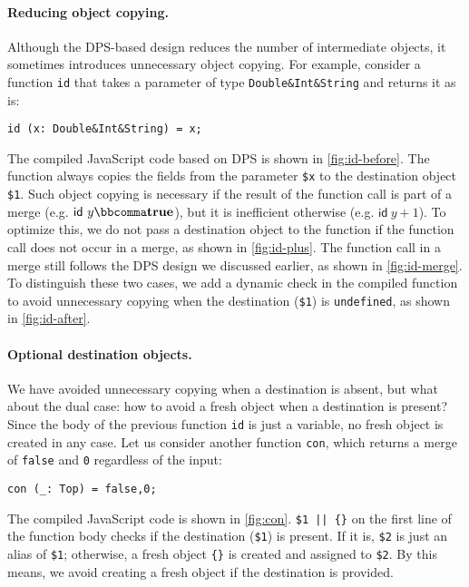 \paragraph{Reducing object copying.} \label{sec:copy}
Although the DPS-based design reduces the number of intermediate objects, it
sometimes introduces unnecessary object copying. For example, consider a
function \lstinline{id} that takes a parameter of type
\lstinline{Double&Int&String} and returns it as is:
\begin{lstlisting}
id (x: Double&Int&String) = x;
\end{lstlisting}
The compiled JavaScript code based on DPS is shown in \autoref{fig:id-before}.
The function always copies the fields from the parameter \lstinline{$x} to the
destination object \lstinline{$1}. Such object copying is necessary if the
result of the function call is part of a merge (e.g. $\textsf{id}\ y \bbcomma  \mathbf{true} $),
but it is inefficient otherwise (e.g. $\textsf{id}\ y + 1$). To optimize this,
we do not pass a destination object to the function if the function call does
not occur in a merge, as shown in \autoref{fig:id-plus}. The function call in a
merge still follows the DPS design we discussed earlier, as shown in
\autoref{fig:id-merge}. To distinguish these two cases, we add a dynamic check
in the compiled function to avoid unnecessary copying when the destination
(\lstinline{$1}) is \lstinline{undefined}, as shown in \autoref{fig:id-after}.

\paragraph{Optional destination objects.}
We have avoided unnecessary copying when a destination is absent, but what about
the dual case: how to avoid a fresh object when a destination is present? Since
the body of the previous function \lstinline{id} is just a variable, no fresh
object is created in any case. Let us consider another function \lstinline{con},
which returns a merge of \lstinline{false} and \lstinline{0} regardless of the
input:
\begin{lstlisting}
con (_: Top) = false,0;
\end{lstlisting}
The compiled JavaScript code is shown in \autoref{fig:con}. \lstinline!$1 || {}!
on the first line of the function body checks if the destination
(\lstinline{$1}) is present. If it is, \lstinline{$2} is just an alias of
\lstinline{$1}; otherwise, a fresh object \lstinline|{}| is created and assigned
to \lstinline{$2}. By this means, we avoid creating a fresh object if the
destination is provided.

